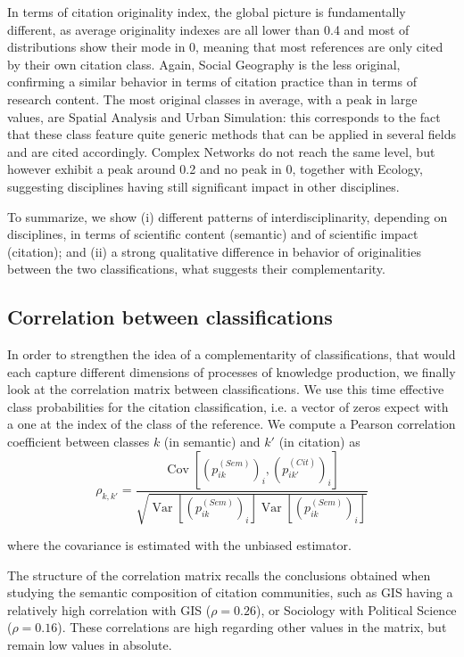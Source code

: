 \documentclass[10pt]{article}
\DeclareMathOperator{\Cov}{Cov}
\DeclareMathOperator{\Var}{Var}
\begin{document}
In terms of citation originality index, the global picture is fundamentally different, as average originality indexes are all lower than 0.4 and most of distributions show their mode in 0, meaning that most references are only cited by their own citation class. Again, Social Geography is the less original, confirming a similar behavior in terms of citation practice than in terms of research content. The most original classes in average, with a peak in large values, are Spatial Analysis and Urban Simulation: this corresponds to the fact that these class feature quite generic methods that can be applied in several fields and are cited accordingly. Complex Networks do not reach the same level, but however exhibit a peak around 0.2 and no peak in 0, together with Ecology, suggesting disciplines having still significant impact in other disciplines.


To summarize, we show (i) different patterns of interdisciplinarity, depending on disciplines, in terms of scientific content (semantic) and of scientific impact (citation); and (ii) a strong qualitative difference in behavior of originalities between the two classifications, what suggests their complementarity.



\subsection*{Correlation between classifications}


In order to strengthen the idea of a complementarity of classifications, that would each capture different dimensions of processes of knowledge production, we finally look at the correlation matrix between classifications. We use this time effective class probabilities for the citation classification, i.e. a vector of zeros expect with a one at the index of the class of the reference. We compute a Pearson correlation coefficient between classes $k$ (in semantic) and $k'$ (in citation) as
\begin{equation}
\rho_{k,k'} = \frac{\Cov \left[ (p^{(Sem)}_{ik})_i , (p^{(Cit)}_{ik'})_i \right]}{\sqrt{\Var\left[(p^{(Sem)}_{ik})_i\right]\Var\left[(p^{(Sem)}_{ik})_i\right]}}
\end{equation}

\noindent where the covariance is estimated with the unbiased estimator.


The structure of the correlation matrix recalls the conclusions obtained when studying the semantic composition of citation communities, such as GIS having a relatively high correlation with GIS ($\rho=0.26$), or Sociology with Political Science ($\rho=0.16$). These correlations are high regarding other values in the matrix, but remain low values in absolute.
\end{document}
